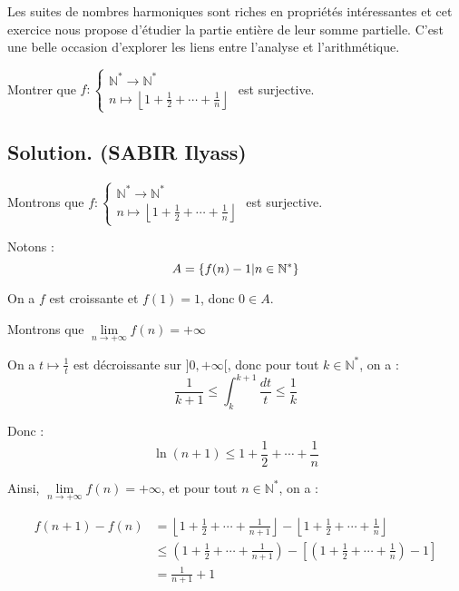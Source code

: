 Les suites de nombres harmoniques sont riches en propri{\'e}t{\'e}s
int{\'e}ressantes et cet exercice nous propose d'{\'e}tudier la partie
enti{\`e}re de leur somme partielle. C'est une belle occasion d'explorer les
liens entre l'analyse et l'arithm{\'e}tique.
\begin{exercise}[]
Montrer que $f : \left\{\begin{array}{l}
  \mathbb{N}^{\ast} \rightarrow \mathbb{N}^{\ast}\\
  n \mapsto \left\lfloor 1 + \frac{1}{2} + \cdots + \frac{1}{n} \right\rfloor
\end{array}\right.$ est surjective.
\end{exercise}

\subsection*{Solution. (SABIR Ilyass)}


Montrons que $f : \left\{\begin{array}{l}
  \mathbb{N}^{\ast} \rightarrow \mathbb{N}^{\ast}\\
  n \mapsto \left\lfloor 1 + \frac{1}{2} + \cdots + \frac{1}{n} \right\rfloor
\end{array}\right.$ est surjective.

Notons :
\[ A =\{f (n) - 1 |  n \in \mathbb{N}^{\ast} \} \]


On a $f$ est croissante et $f (1) = 1$, donc $0 \in A$.

Montrons que $\underset{n \to + \infty}{\lim} f (n) = + \infty$

On a $t \mapsto \frac{1}{t}$ est d{\'e}croissante sur $] 0, + \infty [$, donc
pour tout $k \in \mathbb{N}^{\ast}$, on a :
\[ \frac{1}{k + 1} \leqslant \int_k^{k + 1} \frac{dt}{t} \leqslant
   \frac{1}{k} \]


Donc :
\[ \ln (n + 1) \leqslant 1 + \frac{1}{2} + \cdots + \frac{1}{n} \]


Ainsi, $\underset{n \to + \infty}{\lim} f (n) = + \infty$, et pour tout $n \in
\mathbb{N}^{\ast}$, on a :

\begin{align*}
  f (n + 1) - f (n) & = \left\lfloor 1 + \frac{1}{2} + \cdots + \frac{1}{n +
  1} \right\rfloor - \left\lfloor 1 + \frac{1}{2} + \cdots + \frac{1}{n}
  \right\rfloor\\
  & \leqslant \left( 1 + \frac{1}{2} + \cdots + \frac{1}{n + 1} \right) -
  \left[ \left( 1 + \frac{1}{2} + \cdots + \frac{1}{n} \right) - 1 \right]\\
  & = \frac{1}{n + 1} + 1
\end{align*}

